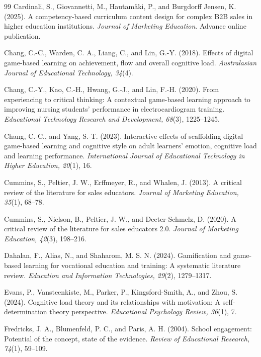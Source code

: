 \documentclass[12pt]{report}
\begin{document}
\begin{thebibliography}{99}
Cardinali, S., Giovannetti, M., Hautam\"aki, P., and Burgdorff Jensen, K. (2025).
A competency-based curriculum content design for complex B2B sales in higher education institutions.
\textit{Journal of Marketing Education}. Advance online publication.

Chang, C.-C., Warden, C. A., Liang, C., and Lin, G.-Y. (2018).
Effects of digital game-based learning on achievement, flow and overall cognitive load.
\textit{Australasian Journal of Educational Technology, 34}(4).

Chang, C.-Y., Kao, C.-H., Hwang, G.-J., and Lin, F.-H. (2020).
From experiencing to critical thinking: A contextual game-based learning approach to improving nursing students' performance in electrocardiogram training.
\textit{Educational Technology Research and Development, 68}(3), 1225--1245.

Chang, C.-C., and Yang, S.-T. (2023).
Interactive effects of scaffolding digital game-based learning and cognitive style on adult learners' emotion, cognitive load and learning performance.
\textit{International Journal of Educational Technology in Higher Education, 20}(1), 16.

Cummins, S., Peltier, J. W., Erffmeyer, R., and Whalen, J. (2013).
A critical review of the literature for sales educators.
\textit{Journal of Marketing Education, 35}(1), 68--78.

Cummins, S., Nielson, B., Peltier, J. W., and Deeter-Schmelz, D. (2020).
A critical review of the literature for sales educators 2.0.
\textit{Journal of Marketing Education, 42}(3), 198--216.

Dahalan, F., Alias, N., and Shaharom, M. S. N. (2024).
Gamification and game-based learning for vocational education and training: A systematic literature review.
\textit{Education and Information Technologies, 29}(2), 1279--1317.

Evans, P., Vansteenkiste, M., Parker, P., Kingsford-Smith, A., and Zhou, S. (2024).
Cognitive load theory and its relationships with motivation: A self-determination theory perspective.
\textit{Educational Psychology Review, 36}(1), 7.

Fredricks, J. A., Blumenfeld, P. C., and Paris, A. H. (2004).
School engagement: Potential of the concept, state of the evidence.
\textit{Review of Educational Research, 74}(1), 59--109.


\end{thebibliography}
\end{document}
